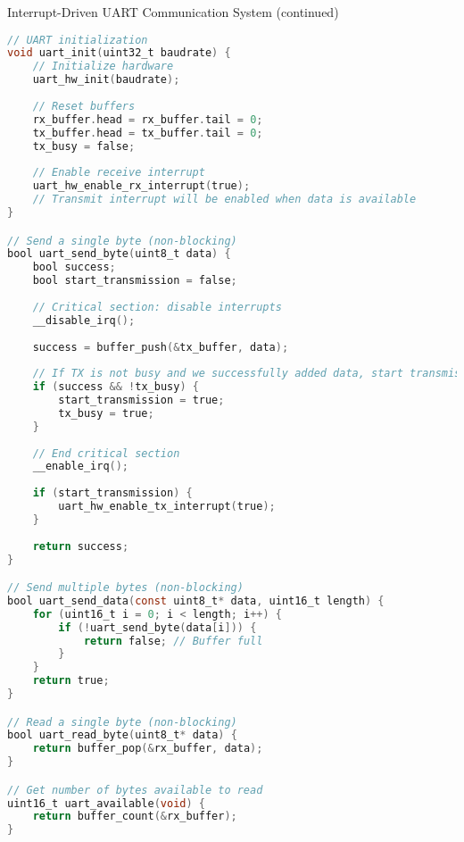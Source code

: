 \begin{example2}{Interrupt-Driven UART Communication System (continued)}
\begin{lstlisting}[language=C, style=basesmol]
// UART initialization
void uart_init(uint32_t baudrate) {
    // Initialize hardware
    uart_hw_init(baudrate);
    
    // Reset buffers
    rx_buffer.head = rx_buffer.tail = 0;
    tx_buffer.head = tx_buffer.tail = 0;
    tx_busy = false;
    
    // Enable receive interrupt
    uart_hw_enable_rx_interrupt(true);
    // Transmit interrupt will be enabled when data is available
}

// Send a single byte (non-blocking)
bool uart_send_byte(uint8_t data) {
    bool success;
    bool start_transmission = false;
    
    // Critical section: disable interrupts
    __disable_irq();
    
    success = buffer_push(&tx_buffer, data);
    
    // If TX is not busy and we successfully added data, start transmission
    if (success && !tx_busy) {
        start_transmission = true;
        tx_busy = true;
    }
    
    // End critical section
    __enable_irq();
    
    if (start_transmission) {
        uart_hw_enable_tx_interrupt(true);
    }
    
    return success;
}

// Send multiple bytes (non-blocking)
bool uart_send_data(const uint8_t* data, uint16_t length) {
    for (uint16_t i = 0; i < length; i++) {
        if (!uart_send_byte(data[i])) {
            return false; // Buffer full
        }
    }
    return true;
}

// Read a single byte (non-blocking)
bool uart_read_byte(uint8_t* data) {
    return buffer_pop(&rx_buffer, data);
}

// Get number of bytes available to read
uint16_t uart_available(void) {
    return buffer_count(&rx_buffer);
}
\end{lstlisting}
\end{example2}

